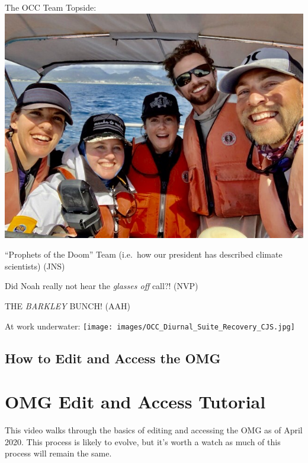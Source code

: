 \documentclass[
]{book}
\begin{document}
The OCC Team Topside:
\includegraphics{images/OCC_Team_March_2020.jpg}

``Prophets of the Doom'' Team (i.e.~how our president has described climate scientists) (JNS)

Did Noah really not hear the \emph{glasses off} call?! (NVP)

THE \emph{BARKLEY} BUNCH! (AAH)

At work underwater:
\texttt{[image: images/OCC\_Diurnal\_Suite\_Recovery\_CJS.jpg]}

\hypertarget{how-to-edit-and-access-the-omg}{%
\section*{How to Edit and Access the OMG}\label{how-to-edit-and-access-the-omg}}

\hypertarget{omg-edit-and-access-tutorial}{%
\chapter{OMG Edit and Access Tutorial}\label{omg-edit-and-access-tutorial}}

This video walks through the basics of editing and accessing the OMG as of April 2020. This process is likely to evolve, but it's worth a watch as much of this process will remain the same.
\end{document}
